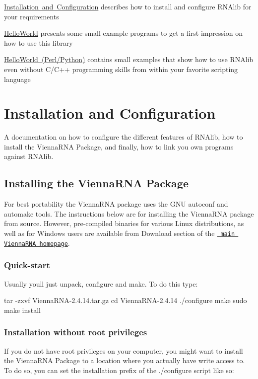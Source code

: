
\begin{DoxyItemize}
\item \mbox{\hyperlink{install}{Installation and Configuration}} describes how to install and configure {\ttfamily R\+N\+Alib} for your requirements
\item \mbox{\hyperlink{helloworld}{Hello\+World}} presents some small example programs to get a first impression on how to use this library
\item \mbox{\hyperlink{helloworld_swig}{Hello\+World (Perl/\+Python)}} contains small examples that show how to use R\+N\+Alib even without C/\+C++ programming skills from within your favorite scripting language 
\end{DoxyItemize}\hypertarget{install}{}\section{Installation and Configuration}\label{install}
A documentation on how to configure the different features of {\ttfamily R\+N\+Alib}, how to install the Vienna\+R\+NA Package, and finally, how to link you own programs against {\ttfamily R\+N\+Alib}.\hypertarget{install_installation}{}\subsection{Installing the Vienna\+R\+N\+A Package}\label{install_installation}
For best portability the Vienna\+R\+NA package uses the G\+NU autoconf and automake tools. The instructions below are for installing the Vienna\+R\+NA package from source. However, pre-\/compiled binaries for various Linux distributions, as well as for Windows users are available from Download section of the \href{https://www.tbi.univie.ac.at/RNA}{\texttt{ main Vienna\+R\+NA homepage}}.\hypertarget{install_quickstart}{}\subsubsection{Quick-\/start}\label{install_quickstart}
Usually you\textquotesingle{}ll just unpack, configure and make. To do this type\+:

\begin{DoxyVerb}tar -zxvf ViennaRNA-2.4.14.tar.gz
cd ViennaRNA-2.4.14
./configure
make
sudo make install
\end{DoxyVerb}
\hypertarget{install_userdir_install}{}\subsubsection{Installation without root privileges}\label{install_userdir_install}
If you do not have root privileges on your computer, you might want to install the Vienna\+R\+NA Package to a location where you actually have write access to. To do so, you can set the installation prefix of the ./configure script like so\+:

